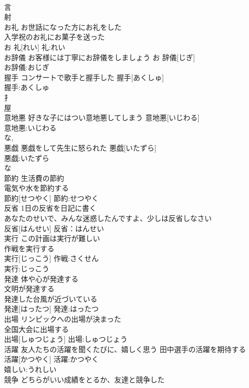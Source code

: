 \documentclass[8pt]{extreport}
\begin{document}
\begin{CJK}{UTF8}{min}
\\	言 
\\	射 
\\	お礼	お世話になった方にお礼をした 
\\	入学祝のお礼にお菓子を送った 
\\	お 礼[れい]			礼:れい
\\	お辞儀	お客様には丁寧にお辞儀をしましょう	お 辞儀[じぎ]	
\\	お辞儀:おじぎ
\\	握手	コンサートで歌手と握手した	握手[あくしゅ]	
\\	握手:あくしゅ
\\	扌 
\\	屋 
\\	意地悪	好きな子にはつい意地悪してしまう	意地悪[いじわる]	
\\	意地悪:いじわる
\\	な, 
\\	悪戯	悪戯をして先生に怒られた	悪戯[いたずら]	
\\	悪戯:いたずら
\\	な
\\	節約	生活費の節約 
\\	電気や水を節約する 
\\	節約[せつやく]			節約:せつやく
\\	反省	1日の反省を日記に書く 
\\	あなたのせいで、みんな迷惑したんですよ、少しは反省しなさい 
\\	反省[はんせい]			反省：はんせい
\\	実行	この計画は実行が難しい 
\\	作戦を実行する 
\\	実行[じっこう]			作戦:さくせん
\\	実行:じっこう
\\	発達	体や心が発達する 
\\	文明が発達する 
\\	発達した台風が近づいている 
\\	発達[はったつ]			発達:はったつ
\\	出場	リンピックへの出場が決まった 
\\	全国大会に出場する 
\\	出場[しゅつじょう]			出場:しゅつじょう
\\	活躍	友人たちの活躍を聞くたびに、嬉しく思う 田中選手の活躍を期待する 
\\	活躍[かつやく]			活躍:かつやく
\\	嬉しい:うれしい
\\	競争	どちらがいい成績をとるか、友達と競争した 

\end{CJK}
\end{document}
